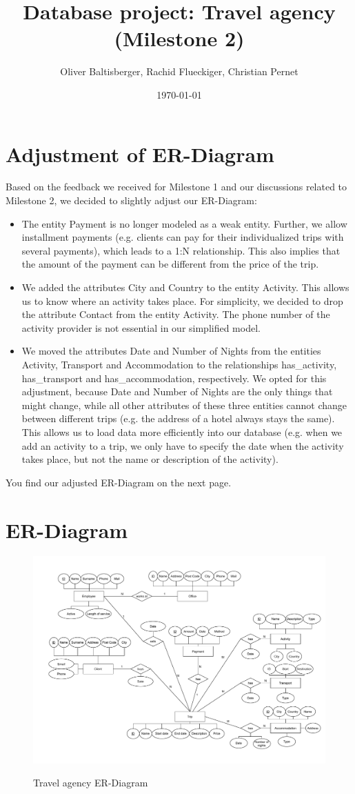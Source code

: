 \documentclass{article}
\title{Database project: Travel agency \\ (Milestone 2)}
\author{Oliver Baltisberger, Rachid Flueckiger, Christian Pernet}
\date{\today}
\begin{document}
	\maketitle
	
	\section*{Adjustment of ER-Diagram}
	Based on the feedback  we received for Milestone 1 and our discussions related to Milestone 2, we decided to slightly adjust our ER-Diagram:
	\begin{itemize}
		\item The entity Payment is no longer modeled as a weak entity. Further, we allow installment payments (e.g. clients can pay for their individualized trips with several payments), which leads to a 1:N relationship.
		This also implies that the amount of the payment can be different from the price of the trip.
		\item We added the attributes City and Country to the entity Activity. This allows us to know where an activity takes place.
		For simplicity, we decided to drop the attribute Contact from the entity Activity. The phone number of the activity provider is not essential in our simplified model.
		\item We moved the attributes Date and Number of Nights from the entities Activity, Transport and Accommodation to the relationships has\_activity, has\_transport and has\_accommodation, respectively.
		We opted for this adjustment, because Date and Number of Nights are the only things that might change, while all other attributes of these three entities cannot change between different trips (e.g. the address of a hotel always stays the same).
		This allows us to load data more efficiently into our database (e.g. when we add an activity to a trip, we only have to specify the date when the activity takes place, but not the name or description of the activity).
	\end{itemize}
	
You find our adjusted ER-Diagram on the next page.
	\newpage
	
	\section*{ER-Diagram}
	\begin{figure}[htbp]
		\centering
			\includegraphics[width=1.15\textwidth, angle=90]{../Diagramm.pdf}
		\label{ER-Model}
		\caption{Travel agency ER-Diagram}
	\end{figure}
	
\end{document}
